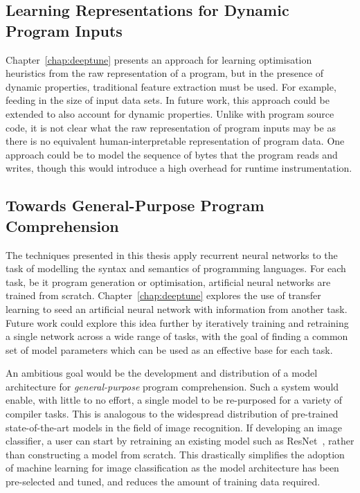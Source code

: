 

\subsection{Learning Representations for Dynamic Program Inputs}

Chapter~\ref{chap:deeptune} presents an approach for learning optimisation heuristics from the raw representation of a program, but in the presence of dynamic properties, traditional feature extraction must be used. For example, feeding in the size of input data sets. In future work, this approach could be extended to also account for dynamic properties. Unlike with program source code, it is not clear what the raw representation of program inputs may be as there is no equivalent human-interpretable representation of program data. One approach could be to model the sequence of bytes that the program reads and writes, though this would introduce a high overhead for runtime instrumentation.


\subsection{Towards General-Purpose Program Comprehension}

The techniques presented in this thesis apply recurrent neural networks to the task of modelling the syntax and semantics of programming languages. For each task, be it program generation or optimisation, artificial neural networks are trained from scratch. Chapter~\ref{chap:deeptune} explores the use of transfer learning to seed an artificial neural network with information from another task. Future work could explore this idea further by iteratively training and retraining a single network across a wide range of tasks, with the goal of finding a common set of model parameters which can be used as an effective base for each task.

An ambitious goal would be the development and distribution of a model architecture for \emph{general-purpose} program comprehension. Such a system would enable, with little to no effort, a single model to be re-purposed for a variety of compiler tasks. This is analogous to the widespread distribution of pre-trained state-of-the-art models in the field of image recognition. If developing an image classifier, a user can start by retraining an existing model such as ResNet~\cite{He2016}, rather than constructing a model from scratch. This drastically simplifies the adoption of machine learning for image classification as the model architecture has been pre-selected and tuned, and reduces the amount of training data required.

